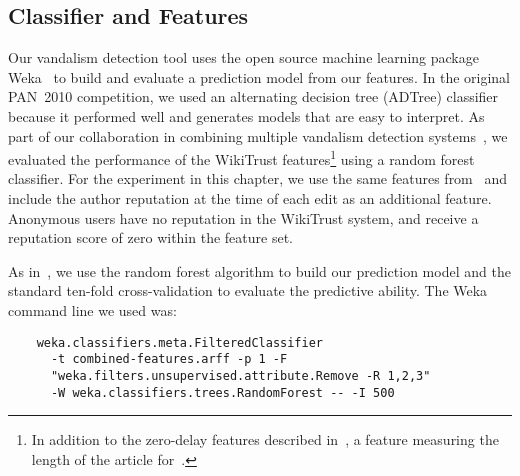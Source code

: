\newcommand{\sign}{{{\textrm{sign}}}}

\subsection{Classifier and Features}

Our vandalism detection tool uses the open source machine learning
package Weka~\cite{Weka09} to build and evaluate a prediction model from
our features.
In the original PAN~2010 competition, we used an alternating decision
tree (ADTree) classifier~\cite{Adler2010b} because it performed well and
generates models that are easy to interpret.
As part of our collaboration in combining multiple vandalism detection
systems~\cite{Adler2011a}, we evaluated the performance of the
WikiTrust features\footnote{In addition to the zero-delay features
described in~\cite{Adler2010b}, a feature measuring the length
of the article for~\cite{Adler2011a}.}
using a random forest classifier.
For the experiment in this chapter, we use the same features
from~\cite{Adler2010b} and include the author reputation at the time of
each edit as an additional feature.
Anonymous users have no reputation in the WikiTrust system, and receive
a reputation score of zero within the feature set.

As in~\cite{Adler2011a}, we use the random forest algorithm to build our
prediction model and the standard ten-fold cross-validation to evaluate
the predictive ability.
The Weka command line we used was:
%
{\small
\begin{verbatim}
    weka.classifiers.meta.FilteredClassifier
      -t combined-features.arff -p 1 -F
      "weka.filters.unsupervised.attribute.Remove -R 1,2,3"
      -W weka.classifiers.trees.RandomForest -- -I 500
\end{verbatim}
}

